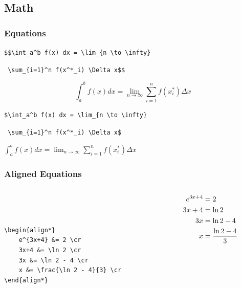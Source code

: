 \documentclass{beamer}
\begin{document}
\subsection{Math}
\begin{frame}[t, fragile]
	\frametitle{Equations}
\Large

\verb|$$\int_a^b f(x) dx = \lim_{n \to \infty}|

\qquad \verb| \sum_{i=1}^n f(x^*_i) \Delta x$$|

$$\int_a^b f(x) dx = \lim_{n \to \infty} \sum_{i=1}^n f(x^*_i) \Delta x$$

\verb|$\int_a^b f(x) dx = \lim_{n \to \infty}|

\qquad \verb| \sum_{i=1}^n f(x^*_i) \Delta x$|

\begin{center}
$\int_a^b f(x) dx = \lim_{n \to \infty} \sum_{i=1}^n f(x^*_i) \Delta x$
\end{center}
\end{frame}

\begin{frame}[t, fragile]
	\frametitle{Aligned Equations}
\Large

\begin{columns}[T]
\begin{column}{2in}
\begin{verbatim}



\begin{align*}
    e^{3x+4} &= 2 \cr
    3x+4 &= \ln 2 \cr
    3x &= \ln 2 - 4 \cr
    x &= \frac{\ln 2 - 4}{3} \cr
\end{align*}
\end{verbatim}
\end{column}
\begin{column}{2in}
\begin{align*}
	e^{3x+4} &= 2 \cr
	3x+4 &= \ln 2 \cr
	3x &= \ln 2 - 4 \cr
	x &= \frac{\ln 2 - 4}{3} \cr
\end{align*}
\end{column}
\end{columns}
\end{frame}

\end{document}
